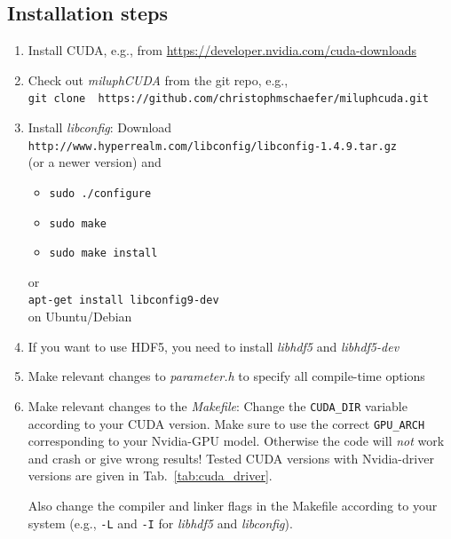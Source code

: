 \documentclass[10pt,fleqn,twoside]{article}
\begin{document}
\subsection{Installation steps}
\begin{enumerate}
 \item Install CUDA, e.g., from \url{https://developer.nvidia.com/cuda-downloads}
 \item Check out \emph{miluphCUDA} from the git repo, e.g.,\\ \verb|git clone  https://github.com/christophmschaefer/miluphcuda.git  |\\
 \item Install \emph{libconfig}: Download\\
       \verb|http://www.hyperrealm.com/libconfig/libconfig-1.4.9.tar.gz|\\
       (or a newer version) and
       \begin{itemize}
        \item \verb|sudo ./configure|
        \item \verb|sudo make|
        \item \verb|sudo make install|
       \end{itemize}
       or\\
       \verb|apt-get install libconfig9-dev|\\
       on Ubuntu/Debian
 \item If you want to use HDF5, you need to install \emph{libhdf5} and \emph{libhdf5-dev}
 \item Make relevant changes to \emph{parameter.h} to specify all compile-time options
 \item Make relevant changes to the \emph{Makefile}: Change the \verb|CUDA_DIR| variable according to your CUDA version. Make sure to use the correct \verb|GPU_ARCH| corresponding to your Nvidia-GPU model. Otherwise the code will \emph{not} work and crash or give wrong results!
       Tested CUDA versions with Nvidia-driver versions are given in Tab.~\ref{tab:cuda_driver}.


       Also change the compiler and linker flags in the Makefile according to your system (e.g., \verb|-L| and \verb|-I| for \emph{libhdf5} and \emph{libconfig}).
\end{enumerate}
\end{document}
